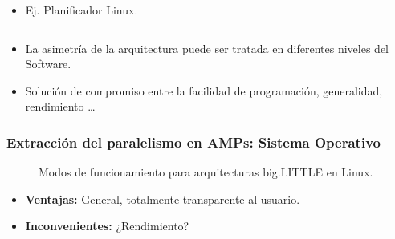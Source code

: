 \documentclass[10pt]{beamer}
\begin{document}
\begin{frame}
\begin{columns}[onlytextwidth]
\begin{column}{0.4\textwidth}
      \begin{itemize}
      \item Ej. Planificador Linux.
      \end{itemize}
      \vfill
    \end{column}
  \end{columns}
  
  \vfill
  
  \begin{itemize}
  \item La asimetría de la arquitectura puede ser tratada en diferentes
    niveles del Software.    
  \item Solución de compromiso entre la facilidad de programación,
    generalidad, rendimiento \ldots    
  \end{itemize}  
\end{frame}


\begin{frame}
  \frametitle{Extracción del paralelismo en AMPs: Sistema Operativo}

  \begin{figure}%
    \centering
    \caption{Modos de funcionamiento para arquitecturas big.LITTLE en Linux.}
    \label{fig:modes}
  \end{figure}

  
  \begin{itemize}
  \item {\bf Ventajas:} General, totalmente transparente al usuario.
  \item {\bf Inconvenientes:} ¿Rendimiento?
  \end{itemize}
\end{frame}
\end{document}
